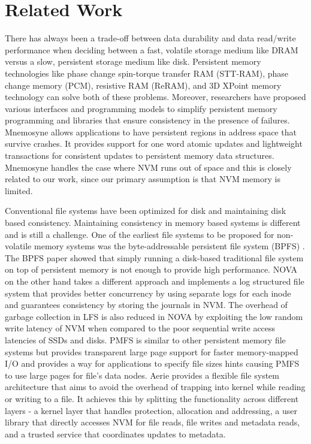 
\section{Related Work}

There has always been a trade-off between data durability and data read/write performance when deciding between a fast, volatile storage medium like DRAM versus a slow, persistent storage medium like disk. Persistent memory technologies like phase change spin-torque transfer RAM (STT-RAM), phase change memory (PCM), resistive RAM (ReRAM), and 3D XPoint memory technology can solve both of these problems\cite{c9}. Moreover, researchers have proposed various interfaces and programming models \cite{c4,c6} to simplify persistent memory programming and libraries that ensure consistency in the presence of failures. Mnemosyne \cite{c6} allows applications to have persistent regions in address space that survive crashes. It provides support for one word atomic updates and lightweight transactions for consistent updates to persistent memory data structures. Mnemosyne handles the case where NVM runs out of space and this is closely related to our work, since our primary assumption is that NVM memory is limited.

Conventional file systems have been optimized for disk and maintaining disk based consistency. Maintaining consistency in memory based systems is different and is still a challenge. One of the earliest file systems to be proposed for non-volatile memory systems was the byte-addressable persistent file system (BPFS) \cite{c10}. The BPFS paper showed that simply running a disk-based traditional file system on top of persistent memory is not enough to provide high performance. NOVA \cite{c8} on the other hand takes a different approach and implements a log structured file system that provides better concurrency by using separate logs for each inode and guarantees consistency by storing the journals in NVM. The overhead of garbage collection in LFS is also reduced in NOVA by exploiting the low random write latency of NVM when compared to the poor sequential write access latencies of SSDs and disks. PMFS \cite{c3} is similar to other persistent memory file systems but provides transparent large page support for faster memory-mapped I/O and provides a way for applications to specify file sizes hints causing PMFS to use large pages for file’s data nodes. Aerie \cite{c5} provides a flexible file system architecture that aims to avoid the overhead of trapping into kernel while reading or writing to a file. It achieves this by splitting the functionality across different layers - a kernel layer that handles protection, allocation and addressing, a user library that directly accesses NVM for file reads, file writes and metadata reads, and a trusted service that coordinates updates to metadata.  
 
